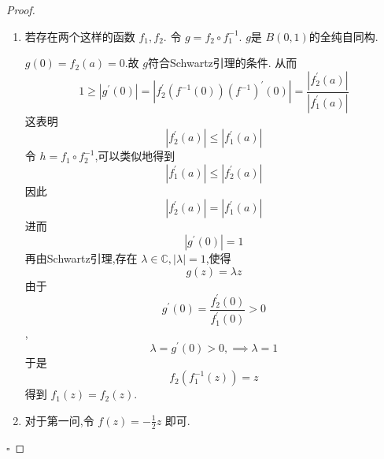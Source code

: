 \documentclass[../../复变函数.tex]{subfiles}
\begin{document}
\begin{proof}
    \begin{enumerate}
        \item 若存在两个这样的函数 \(  f_1,f_2  \). 令 \(  g = f_2\circ f_1^{-1}   \). \(  g  \)是 \(  B\left( 0,1 \right)   \)的全纯自同构.  

    \(  g\left( 0 \right)= f_2\left( a \right)= 0    \).故 \(  g  \)符合Schwartz引理的条件. 从而 \[
    1\ge \left| g^{\prime} \left( 0 \right)  \right|= \left| f_2^{\prime} \left( f^{-1} \left( 0 \right)  \right)\left( f^{-1}  \right)^{\prime} \left( 0 \right)    \right|= \frac{\left| f_2^{\prime} \left( a \right)  \right|  }{\left| f_1^{\prime} \left( a \right)  \right|  }   
    \]  这表明 \[
    \left| f_2^{\prime} \left( a \right)  \right|\le \left| f_1^{\prime} \left( a \right)  \right|  
    \]令 \(  h= f_1\circ f_2^{-1}   \),可以类似地得到 \[
    \left| f_1^{\prime} \left( a \right)  \right|\le \left| f_2^{\prime} \left( a \right)  \right|  
    \] 因此 \[
    \left| f_2^{\prime} \left( a \right)  \right|= \left| f_1^{\prime} \left( a \right)  \right|  
    \]进而 \[
    \left| g^{\prime} \left( 0 \right)  \right|= 1 
    \]再由Schwartz引理,存在 \(   \lambda \in \mathbb{C} ,\left|  \lambda  \right|= 1   \),使得 \[
    g\left( z \right)=  \lambda z 
    \]由于 \[
    g^{\prime} \left( 0 \right)= \frac{f_2^{\prime} \left( 0 \right)  }{f_1^{\prime} \left( 0 \right)  }> 0  
    \] , \[
     \lambda = g^{\prime} \left( 0 \right)> 0,\implies  \lambda = 1 
    \]于是\[
    f_2\left( f_1^{-1} \left( z \right)  \right)=   z 
    \] 得到 \(  f_1\left( z \right)= f_2\left( z \right)    \). 
    \item 对于第一问,令 \(  f\left( z \right)= -\frac{1 }{2 }z    \) 即可.
    
 
    \end{enumerate}
    

    \hfill $\square$
\end{proof}
\end{document}
